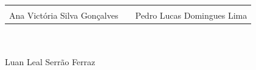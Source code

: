 \documentclass[12pt,a4paper]{article}
\begin{document}
\vspace{1.5cm}
\begin{center}
    \begin{tabular}{ccc}
    \underline{\hspace{5cm}} & \hspace{1cm} & \underline{\hspace{5cm}} \\
    Ana Victória Silva Gonçalves & & Pedro Lucas Domingues Lima \\
    \end{tabular}
    \\[1.9cm]
    \underline{\hspace{5cm}} \\
    Luan Leal Serrão Ferraz
\end{center}
\end{document}

